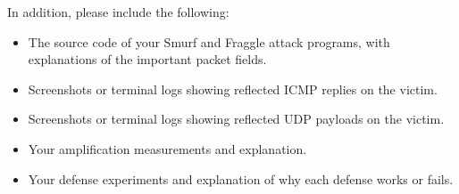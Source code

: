 \seedsubmission

In addition, please include the following:

\begin{itemize}[noitemsep]
\item The source code of your Smurf and Fraggle attack programs, with
      explanations of the important packet fields.
\item Screenshots or terminal logs showing reflected ICMP replies on the victim.
\item Screenshots or terminal logs showing reflected UDP payloads on the victim.
\item Your amplification measurements and explanation.
\item Your defense experiments and explanation of why each defense works or
      fails.
\end{itemize}


